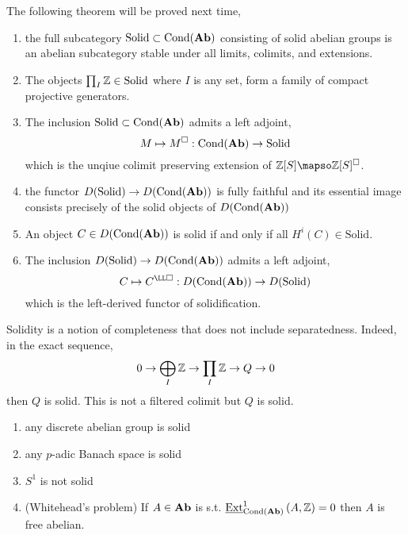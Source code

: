 \documentclass[12pt]{article}
\newcommand{\Cond}{\mathrm{Cond}}
\newcommand{\sol}{\square}
\begin{document}
The following theorem will be proved next time,
\newcommand{\Solid}{\mathrm{Solid}}
\begin{theorem}
\begin{enumerate}
\item the full subcategory $\Solid \subset \Cond(\Ab)$ consisting of solid abelian groups is an abelian subcategory stable under all limits, colimits, and extensions. 

\item The objects $\prod_I \Z \in \Solid$ where $I$ is any set, form a family of compact projective generators. 

\item The inclusion $\Solid \subset \Cond(\Ab)$ admits a left adjoint,
\[ M \mapsto M^\sol : \Cond(\Ab) \to \Solid \]
which is the unqiue colimit preserving extension of $\Z[S] \mapso \Z[S]^\sol$.

\item the functor $D(\Solid) \to D(\Cond(\Ab))$ is fully faithful and its essential image consists precisely of the solid objects of $D(\Cond(\Ab))$ 

\item An object $C \in D(\Cond(\Ab))$ is solid if and only if all $H^i(C) \in \Solid$.

\item The inclusion $D(\Solid) \to D(\Cond(\Ab))$ admits a left adjoint,
\[ C \mapsto C^{\LL \sol} : D(\Cond(\Ab)) \to D(\Solid) \]
which is the left-derived functor of solidification. 
\end{enumerate}
\end{theorem}

\begin{rmk}
Solidity is a notion of completeness that does not include separatedness. Indeed, in the exact sequence,
\[ 0 \to \bigoplus_I \mathbb{Z} \to \prod_I \mathbb{Z} \to Q \to 0 \]
then $Q$ is solid. This is not a filtered colimit but $Q$ is solid. 
\end{rmk}

\newcommand{\uExt}[4]{\underline{\mathrm{Ext}}^{#1}_{#2}\left( #3, #4 \right)} 

\begin{cor}
\begin{enumerate}
\item any discrete abelian group is solid

\item any $p$-adic Banach space is solid

\item $S^1$ is not solid

\item (Whitehead's problem) If $A \in \mathbf{Ab}$ is s.t. $\uExt{1}{\Cond(\Ab)}{A}{\Z} = 0$ then $A$ is free abelian.
\end{enumerate}
\end{cor}
\end{document}

